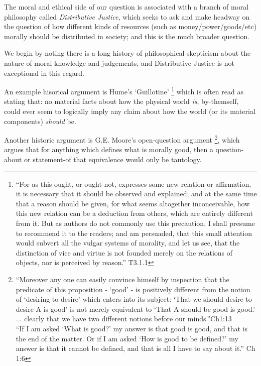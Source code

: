 
The moral and ethical side of our question is associated with a branch of moral philosophy called \textit{Distributive Justice}, which seeks to ask and make headway on the question of how different kinds of resources (such as money/power/goods/etc) morally should be distributed in society; and this is the much broader question.

We begin by noting there is a long history of philosophical skepticism about the nature of moral knowledge and judgements, and Distributive Justice is not exceptional in this regard.

An example hisorical argument is Hume's `Guillotine' \cite{HumeGutenberg}\footnote{``For as this ought, or ought not, expresses some new relation or affirmation, it is necessary that it should be observed and explained; and at the same time that a reason should be given, for what seems altogether inconceivable, how this new relation can be a deduction from others, which are entirely different from it. But as authors do not commonly use this precaution, I shall presume to recommend it to the readers; and am persuaded, that this small attention would subvert all the vulgar systems of morality, and let us see, that the distinction of vice and virtue is not founded merely on the relations of objects, nor is perceived by reason.'' T3.1.1} which is often read as stating that: no material facts about how the physical world \textit{is}, by-themself, could ever seem to logically imply any claim about how the world (or its material components) \textit{should} be.

Another historic argument is G.E. Moore's open-question argument \cite{MooreGutenberg}\footnote{
``Moreover any one can easily convince himself by inspection that the predicate of this proposition - `good' - is positively different from the notion of `desiring to desire' which enters into its subject: `That we should desire to desire A is good' is not merely equivalent to `That A should be good is good.' ... clearly that we have two different notions before our minds.''Ch1:13\\
``If I am asked `What is good?' my answer is that good is good, and that is the end of the matter. Or if I am asked `How is good to be defined?' my answer is that it cannot be defined, and that is all I have to say about it.'' Ch 1:6}, which argues that for anything which defines what is morally good, then a question-about or statement-of that equivalence would only be tautology.

